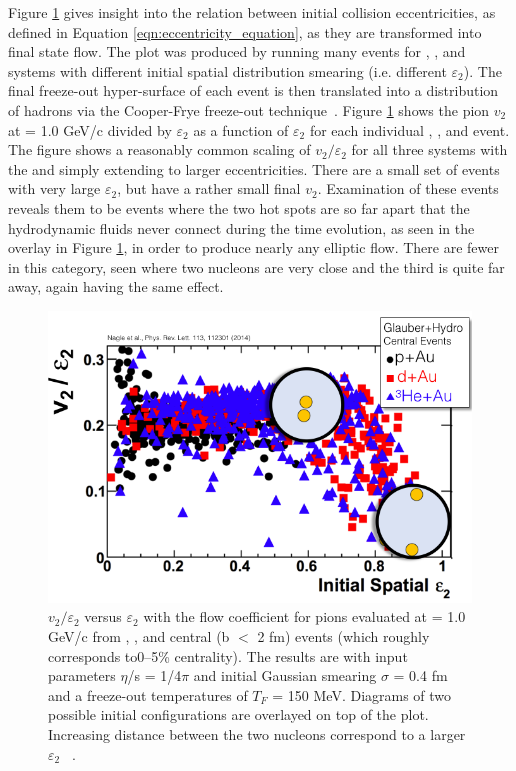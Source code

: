 Figure \ref{fig:v2_epsi2_ampt} gives insight into the relation between initial collision eccentricities, as defined in Equation \ref{eqn:eccentricity_equation}, as they are transformed into final state flow. The plot was produced by running many events for \pau, \dau, and \hau systems with different initial spatial distribution smearing (i.e. different $\varepsilon_2$). The final freeze-out hyper-surface of each event is then translated into a distribution of hadrons via the Cooper-Frye freeze-out technique~\cite{PhysRevD.10.186}. Figure \ref{fig:v2_epsi2_ampt} shows the pion $v_2$ at \pt = 1.0 GeV/c divided by $\varepsilon_2$ as a function of $\varepsilon_2$ for each individual \pau, \dau, and \hau event. The figure shows a reasonably common scaling of $v_2/\varepsilon_2$ for all three systems with the \dau and \hau simply extending to larger eccentricities. There are a small set of events with very large $\varepsilon_2$, but have a rather small final $v_2$. Examination of these events reveals them to be \dau events where the two hot spots are so far apart that the hydrodynamic fluids never connect during the time evolution, as seen in the overlay in Figure \ref{fig:v2_epsi2_ampt}, in order to produce nearly any elliptic flow. There are fewer \hau in this category, seen where two nucleons are very close and the third is quite far away, again having the same effect.


\begin{figure}[!ht]
\begin{center}
\includegraphics[width=0.6\linewidth]{figs/v2_e2_ampt.png}
\caption{$v_2/\varepsilon_2$ versus $\varepsilon_2$ with the flow coefficient
for pions evaluated at \pt = 1.0 GeV/c from \pau,
\dau, and \hau central (b $<$ 2 fm) events (which roughly corresponds to0--5\% centrality). The results
are with input parameters $\eta$/s = 1/4$\pi$ and initial Gaussian
smearing $\sigma$ = 0.4 fm and a freeze-out temperatures of $T_F$ = 150
MeV. Diagrams of two possible \dau initial configurations are overlayed on top of the plot. Increasing distance between the two \dau nucleons correspond to a larger $\varepsilon_2$ ~\cite{PhysRevLett.113.112301}.}
\label{fig:v2_epsi2_ampt}
\end{center}
\end{figure}

